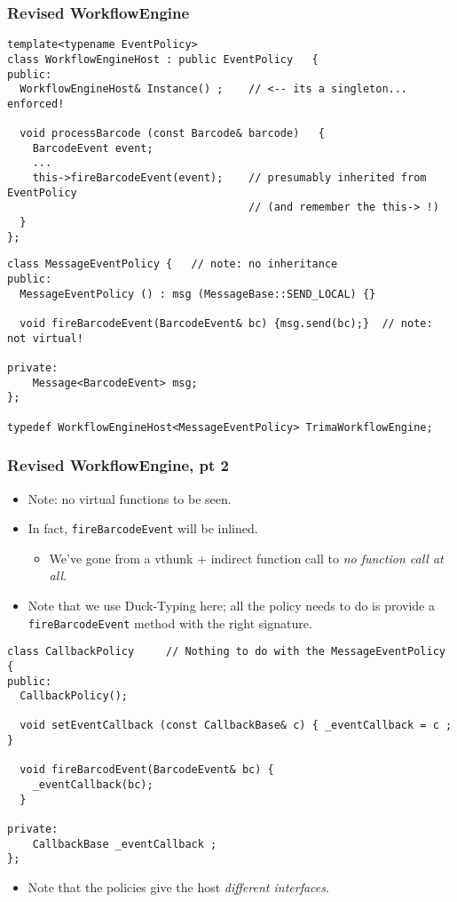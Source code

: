 \begin{frame}[fragile,t]
\frametitle{Revised WorkflowEngine}
{\scriptsize
\begin{verbatim}
template<typename EventPolicy>
class WorkflowEngineHost : public EventPolicy   {
public:
  WorkflowEngineHost& Instance() ;    // <-- its a singleton... enforced!

  void processBarcode (const Barcode& barcode)   {
    BarcodeEvent event;
    ...
    this->fireBarcodeEvent(event);    // presumably inherited from EventPolicy
                                      // (and remember the this-> !)
  }
};
\end{verbatim}
}
\pause
{}
{\scriptsize\begin{verbatim}
class MessageEventPolicy {   // note: no inheritance
public:
  MessageEventPolicy () : msg (MessageBase::SEND_LOCAL) {}

  void fireBarcodeEvent(BarcodeEvent& bc) {msg.send(bc);}  // note: not virtual!

private:
    Message<BarcodeEvent> msg;
};

typedef WorkflowEngineHost<MessageEventPolicy> TrimaWorkflowEngine;
\end{verbatim}
}
\end{frame}


\begin{frame}[fragile,t]
\frametitle{Revised WorkflowEngine, pt 2}
\begin{itemize}[<+->]
\item Note: no virtual functions to be seen.
\item In fact, \texttt{fireBarcodeEvent} will be inlined.
  \begin{itemize}
    \item We've gone from a vthunk + indirect function call to
      \emph{no function call at all}.
  \end{itemize}
\item Note that we use Duck-Typing here; all the policy needs to do is
  provide a \texttt{fireBarcodeEvent} method with the right signature.
\end{itemize}
\pause
{\scriptsize
\begin{verbatim}
class CallbackPolicy     // Nothing to do with the MessageEventPolicy
{
public:
  CallbackPolicy();

  void setEventCallback (const CallbackBase& c) { _eventCallback = c ; }  

  void fireBarcodEvent(BarcodeEvent& bc) {
    _eventCallback(bc); 
  }

private:
    CallbackBase _eventCallback ;
};
\end{verbatim}
}

\begin{itemize}[<+->]
\item Note that the policies give the host \emph{different interfaces}.
\end{itemize}
\end{frame}

